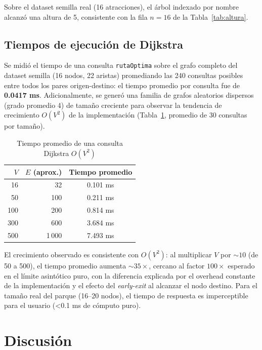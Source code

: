 \documentclass[conference]{IEEEtran}
\begin{document}
Sobre el dataset semilla real (16 atracciones), el \'arbol indexado por
nombre alcanz\'o una altura de 5, consistente con la fila $n=16$ de la
Tabla~\ref{tab:altura}.

\subsection{Tiempos de ejecuci\'on de Dijkstra}

Se midi\'o el tiempo de una consulta \texttt{rutaOptima} sobre el grafo
completo del dataset semilla (16 nodos, 22 aristas) promediando las 240
consultas posibles entre todos los pares origen-destino: el tiempo promedio
por consulta fue de \textbf{0.0417 ms}. Adicionalmente, se gener\'o una
familia de grafos aleatorios dispersos (grado promedio 4) de tama\~no
creciente para observar la tendencia de crecimiento $O(V^2)$ de la
implementaci\'on (Tabla~\ref{tab:dijkstra}, promedio de 30 consultas por
tama\~no).

\begin{table}[htbp]
\caption{Tiempo promedio de una consulta Dijkstra $O(V^2)$}
\label{tab:dijkstra}
\centering
\begin{tabular}{@{}rrc@{}}
\toprule
\textbf{$V$} & \textbf{$E$ (aprox.)} & \textbf{Tiempo promedio} \\
\midrule
16 & 32 & 0.101 ms \\
50 & 100 & 0.211 ms \\
100 & 200 & 0.814 ms \\
300 & 600 & 3.684 ms \\
500 & 1\,000 & 7.493 ms \\
\bottomrule
\end{tabular}
\end{table}

El crecimiento observado es consistente con $O(V^2)$: al multiplicar $V$ por
$\sim\!10$ (de 50 a 500), el tiempo promedio aumenta $\sim\!35\times$, cercano
al factor $100\times$ esperado en el l\'imite asint\'otico puro, con la
diferencia explicada por el overhead constante de la implementaci\'on y el
efecto del \emph{early-exit} al alcanzar el nodo destino. Para el tama\~no
real del parque (16--20 nodos), el tiempo de respuesta es imperceptible para
el usuario (\textless 0.1 ms de c\'omputo puro).

\section{Discusi\'on}
\end{document}
